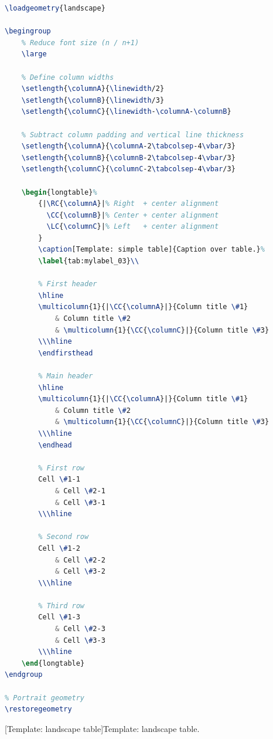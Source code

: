 \begin{figure}[H]
    \centering
    \begin{multicols}{2}
        \begin{lstlisting}[language=LaTeX]
% Landscape geometry
\loadgeometry{landscape}

\begingroup
    % Reduce font size (n / n+1)
    \large
    
    % Define column widths
    \setlength{\columnA}{\linewidth/2}
    \setlength{\columnB}{\linewidth/3}
    \setlength{\columnC}{\linewidth-\columnA-\columnB}
    
    % Subtract column padding and vertical line thickness
    \setlength{\columnA}{\columnA-2\tabcolsep-4\vbar/3}
    \setlength{\columnB}{\columnB-2\tabcolsep-4\vbar/3}
    \setlength{\columnC}{\columnC-2\tabcolsep-4\vbar/3}
    
    \begin{longtable}%
        {|\RC{\columnA}|% Right  + center alignment
          \CC{\columnB}|% Center + center alignment
          \LC{\columnC}|% Left   + center alignment
        }
        \caption[Template: simple table]{Caption over table.}%
        \label{tab:mylabel_03}\\
        
        % First header
        \hline
        \multicolumn{1}{|\CC{\columnA}|}{Column title \#1}
            & Column title \#2
            & \multicolumn{1}{\CC{\columnC}|}{Column title \#3}
        \\\hline
        \endfirsthead
        
        % Main header
        \hline
        \multicolumn{1}{|\CC{\columnA}|}{Column title \#1}
            & Column title \#2
            & \multicolumn{1}{\CC{\columnC}|}{Column title \#3}
        \\\hline
        \endhead
        
        % First row
        Cell \#1-1
            & Cell \#2-1
            & Cell \#3-1
        \\\hline
        
        % Second row
        Cell \#1-2
            & Cell \#2-2
            & Cell \#3-2
        \\\hline
        
        % Third row
        Cell \#1-3
            & Cell \#2-3
            & Cell \#3-3
        \\\hline
    \end{longtable}
\endgroup

% Portrait geometry
\restoregeometry
        \end{lstlisting}
    \end{multicols}
    [Template: landscape table]{Template: landscape table.}
    \label{lst:tutorial/templates/table/landscape}
\end{figure}

